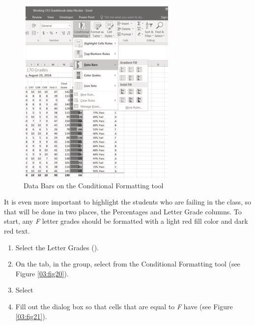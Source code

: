 \begin{figure}[H]
	\centering
	\includegraphics[width=\maxwidth{.95\linewidth}]{gfx/ch03_fig19}
	\caption{Data Bars on the Conditional Formatting tool}
	\label{03:fig19}
\end{figure}

It is even more important to highlight the students who are failing in the class, so that will be done in two places, the Percentages and Letter Grade columns. To start, any \textit{F} letter grades should be formatted with a light red fill color and dark red text.

\begin{enumerate}
	\item Select the Letter Grades ().
	\item On the  tab, in the  group, select  from the Conditional Formatting tool (see Figure \ref{03:fig20}).
	\item Select 
	\item Fill out the  dialog box so that cells that are equal to \textit{F} have  (see Figure \ref{03:fig21}).
\end{enumerate}

